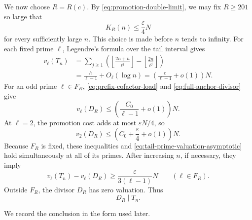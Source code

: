 \documentclass[11pt]{article}
\numberwithin{equation}{section}
\theoremstyle{definition}
\theoremstyle{remark}
\newcommand{\1}{\mathbf 1}
\begin{document}
We now choose \(R=R(c)\).  By
\eqref{eq:promotion-double-limit}, we may fix \(R\ge201\) so large that
\begin{equation}
                       K_R(n)\le\frac{\varepsilon}{4}N
                       \label{eq:chosen-promotion-budget}
\end{equation}
for every sufficiently large \(n\).  This choice is made before \(n\)
tends to infinity.  For each fixed prime \(\ell\), Legendre's formula
over the tail interval gives
\begin{equation}
 \begin{split}
 v_\ell(T_n)
  &=\sum_{j\ge1}
     \left(
       \left\lfloor\frac{2n+h}{\ell^j}\right\rfloor
       -\left\lfloor\frac{2n}{\ell^j}\right\rfloor
     \right)\\
  &=\frac{h}{\ell-1}+O_\ell(\log n)
   =\left(\frac{c}{\ell-1}+o(1)\right)N.
 \end{split}
 \label{eq:tail-prime-valuation-asymptotic}
\end{equation}
For an odd prime \(\ell\in F_R\),
\eqref{eq:prefix-cofactor-load} and \eqref{eq:full-anchor-divisor} give
\[
       v_\ell(D_R)
       \le\left(\frac{C_0}{\ell-1}+o(1)\right)N.
\]
At \(\ell=2\), the promotion cost adds at most
\(\varepsilon N/4\), so
\[
       v_2(D_R)
       \le\left(C_0+\frac{\varepsilon}{4}+o(1)\right)N.
\]
Because \(F_R\) is fixed, these inequalities and
\eqref{eq:tail-prime-valuation-asymptotic} hold simultaneously at all
of its primes.  After increasing \(n\), if necessary, they imply
\begin{equation}
       v_\ell(T_n)-v_\ell(D_R)
       \ge\frac{\varepsilon}{3(\ell-1)}N
       \qquad(\ell\in F_R).
 \label{eq:strict-anchor-reserve}
\end{equation}
Outside \(F_R\), the divisor \(D_R\) has zero valuation.  Thus
\begin{equation}
                       D_R\mid T_n.
                       \label{eq:anchor-divides-tail}
\end{equation}

We record the conclusion in the form used later.
\end{document}
